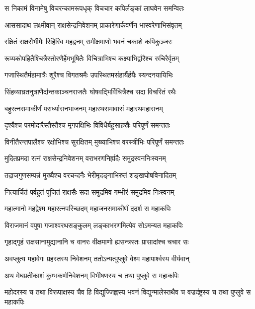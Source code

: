 
\twolineshloka
{स निकामं विनामेषु विचरन्कामरूपधृक्}
{विचचार कपिर्लङ्कां लाघवेन समन्वितः} %

\twolineshloka
{आससादाथ लक्ष्मीवान् राक्षसेन्द्रनिवेशनम्}
{प्राकारेणार्कवर्णेन भास्वरेणाभिसंवृतम्} %

\twolineshloka
{रक्षितं राक्षसैर्भीमैः सिंहैरिव महद्वनम्}
{समीक्षमाणो भवनं चकाशे कपिकुञ्जरः} %

\twolineshloka
{रूप्यकोपहितैश्चित्रैस्तोरणैर्हेमभूषितैः}
{विचित्राभिश्च कक्ष्याभिर्द्वारैश्च रुचिरैर्वृतम्} %

\twolineshloka
{गजास्थितैर्महामात्रैः शूरैश्च विगतश्रमैः}
{उपस्थितमसंहार्यैर्हयैः स्यन्दनयायिभिः} %

\twolineshloka
{सिंहव्याघ्रतनुत्राणैर्दान्तकाञ्चनराजतैः}
{घोषवद्भिर्विचित्रैश्च सदा विचरितं रथैः} %

\twolineshloka
{बहुरत्नसमाकीर्णं परार्ध्यासनभाजनम्}
{महारथसमावासं महारथमहासनम्} %

\twolineshloka
{दृश्यैश्च परमोदारैस्तैस्तैश्च मृगपक्षिभिः}
{विविधैर्बहुसाहस्रैः परिपूर्णं समन्ततः} %

\twolineshloka
{विनीतैरन्तपालैश्च रक्षोभिश्च सुरक्षितम्}
{मुख्याभिश्च वरस्त्रीभिः परिपूर्णं समन्ततः} %

\twolineshloka
{मुदितप्रमदा रत्नं राक्षसेन्द्रनिवेशनम्}
{वराभरणनिर्ह्रादैः समुद्रस्वननिःस्वनम्} %

\twolineshloka
{तद्राजगुणसम्पन्नं मुख्यैश्च वरचन्दनैः}
{भेरीमृदङ्गाभिरुतं शङ्खघोषविनादितम्} %

\twolineshloka
{नित्यार्चितं पर्वहुतं पूजितं राक्षसैः सदा}
{समुद्रमिव गम्भीरं समुद्रमिव निःस्वनम्} %

\twolineshloka
{महात्मानो महद्वेश्म महारत्नपरिच्छदम्}
{महाजनसमाकीर्णं ददर्श स महाकपिः} %

\twolineshloka
{विराजमानं वपुषा गजाश्वरथसङ्कुलम्}
{लङ्काभरणमित्येव सोऽमन्यत महाकपिः} %

\twolineshloka
{गृहाद्गृहं राक्षसानामुद्यानानि च वानरः}
{वीक्षमाणो ह्यसन्त्रस्तः प्रासादांश्च चचार सः} %

\twolineshloka
{अवप्लुत्य महावेगः प्रहस्तस्य निवेशनम्}
{ततोऽन्यत्पुप्लुवे वेश्म महापार्श्वस्य वीर्यवान्} %

\twolineshloka
{अथ मेघप्रतीकाशं कुम्भकर्णनिवेशनम्}
{विभीषणस्य च तथा पुप्लुवे स महाकपिः} %

\threelineshloka
{महोदरस्य च तथा विरूपाक्षस्य चैव हि}
{विद्युज्जिह्वस्य भवनं विद्युन्मालेस्तथैव च}
{वज्रदंष्ट्रस्य च तथा पुप्लुवे स महाकपिः} %


